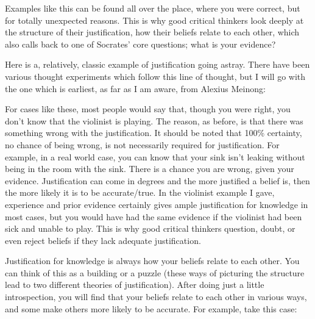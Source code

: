 Examples like this can be found all over the place, where you were correct, but for totally unexpected reasons. This is why good critical thinkers look deeply at the structure of their justification, how their beliefs relate to each other, which also calls back to one of Socrates' core questions; what is your evidence?

Here is a, relatively, classic example of justification going astray. There have been various thought experiments which follow this line of thought, but I will go with the one which is earliest, as far as I am aware, from Alexius Meinong: 


For cases like these, most people would say that, though you were right, you don't know that the violinist is playing. The reason, as before, is that there was something wrong with the justification. It should be noted that 100\% certainty, no chance of being wrong, is not necessarily required for justification. For example, in a real world case, you can know that your sink isn't leaking without being in the room with the sink. There is a chance you are wrong, given your evidence. Justification can come in degrees and the more justified a belief is, then the more likely it is to be accurate/true. In the violinist example I gave, experience and prior evidence certainly gives ample justification for knowledge in most cases, but you would have had the same evidence if the violinist had been sick and unable to play. This is why good critical thinkers question, doubt, or even reject beliefs if they lack adequate justification.

Justification for knowledge is always how your beliefs relate to each other. You can think of this as a building or a puzzle (these ways of picturing the structure lead to two different theories of justification). After doing just a little introspection, you will find that your beliefs relate to each other in various ways, and some make others more likely to be accurate. For example, take this case:

